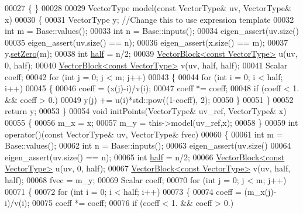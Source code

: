 \begin{DoxyCode}
00027   \{ \}
00028   
00029   VectorType model(\textcolor{keyword}{const} VectorType& uv, VectorType& x)
00030   \{
00031     VectorType y; \textcolor{comment}{//Change this to use expression template}
00032     \textcolor{keywordtype}{int} m = Base::values(); 
00033     \textcolor{keywordtype}{int} n = Base::inputs();
00034     eigen\_assert(uv.size()%
00035     eigen\_assert(uv.size() == n);
00036     eigen\_assert(x.size() == m);
00037     y.\hyperlink{class_eigen_1_1_plain_object_base_ac21ad5f989f320e46958b75ac8d9a1da}{setZero}(m);
00038     \textcolor{keywordtype}{int} \hyperlink{struct_eigen_1_1half}{half} = n/2;
00039     \hyperlink{group___core___module_class_eigen_1_1_vector_block}{VectorBlock<const VectorType>} u(uv, 0, half);
00040     \hyperlink{group___core___module_class_eigen_1_1_vector_block}{VectorBlock<const VectorType>} v(uv, half, half);
00041     Scalar coeff;
00042     \textcolor{keywordflow}{for} (\textcolor{keywordtype}{int} j = 0; j < m; j++)
00043     \{
00044       \textcolor{keywordflow}{for} (\textcolor{keywordtype}{int} i = 0; i < half; i++) 
00045       \{
00046         coeff = (x(j)-i)/v(i);
00047         coeff *= coeff;
00048         \textcolor{keywordflow}{if} (coeff < 1. && coeff > 0.)
00049           y(j) += u(i)*std::pow((1-coeff), 2);
00050       \}
00051     \}
00052     \textcolor{keywordflow}{return} y;
00053   \}
00054   \textcolor{keywordtype}{void} initPoints(VectorType& uv\_ref, VectorType& x)
00055   \{
00056     m\_x = x;
00057     m\_y = this->model(uv\_ref,x);
00058   \}
00059   \textcolor{keywordtype}{int} operator()(\textcolor{keyword}{const} VectorType& uv, VectorType& fvec)
00060   \{
00061     \textcolor{keywordtype}{int} m = Base::values(); 
00062     \textcolor{keywordtype}{int} n = Base::inputs();
00063     eigen\_assert(uv.size()%
00064     eigen\_assert(uv.size() == n);
00065     \textcolor{keywordtype}{int} \hyperlink{struct_eigen_1_1half}{half} = n/2;
00066     \hyperlink{group___core___module_class_eigen_1_1_vector_block}{VectorBlock<const VectorType>} u(uv, 0, half);
00067     \hyperlink{group___core___module_class_eigen_1_1_vector_block}{VectorBlock<const VectorType>} v(uv, half, half);
00068     fvec = m\_y;
00069     Scalar coeff;
00070     \textcolor{keywordflow}{for} (\textcolor{keywordtype}{int} j = 0; j < m; j++)
00071     \{
00072       \textcolor{keywordflow}{for} (\textcolor{keywordtype}{int} i = 0; i < half; i++)
00073       \{
00074         coeff = (m\_x(j)-i)/v(i);
00075         coeff *= coeff;
00076         \textcolor{keywordflow}{if} (coeff < 1. && coeff > 0.)

\end{DoxyCode}
